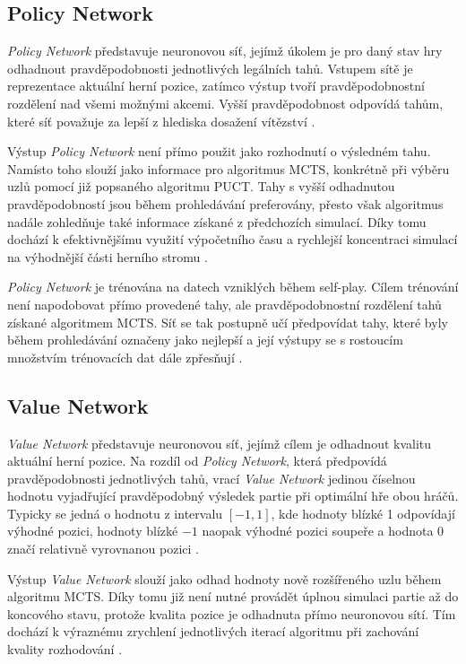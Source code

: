 \subsection{Policy Network}

\emph{Policy Network} představuje neuronovou síť, jejímž úkolem je pro daný stav hry odhadnout pravděpodobnosti jednotlivých 
legálních tahů. Vstupem sítě je reprezentace aktuální herní pozice, zatímco výstup tvoří pravděpodobnostní rozdělení nad všemi 
možnými akcemi. Vyšší pravděpodobnost odpovídá tahům, které síť považuje za lepší z hlediska dosažení vítězství \cite{silver2017alphazero}.

Výstup \emph{Policy Network} není přímo použit jako rozhodnutí o výsledném tahu. Namísto toho slouží jako informace pro algoritmus MCTS, 
konkrétně při výběru uzlů pomocí již popsaného algoritmu PUCT. Tahy s vyšší odhadnutou pravděpodobností jsou během prohledávání preferovány, přesto však 
algoritmus nadále zohledňuje také informace získané z předchozích simulací. Díky tomu dochází k efektivnějšímu využití výpočetního času a 
rychlejší koncentraci simulací na výhodnější části herního stromu \cite{silver2017alphazero}.

\emph{Policy Network} je trénována na datech vzniklých během self-play. Cílem trénování není napodobovat přímo provedené tahy, ale pravděpodobnostní 
rozdělení tahů získané algoritmem MCTS. Síť se tak postupně učí předpovídat tahy, které byly během prohledávání označeny jako nejlepší 
a její výstupy se s rostoucím množstvím trénovacích dat dále zpřesňují \cite{silver2017alphazero}.

\subsection{Value Network}

\emph{Value Network} představuje neuronovou síť, jejímž cílem je odhadnout kvalitu aktuální herní pozice. Na rozdíl od \emph{Policy Network}, 
která předpovídá pravděpodobnosti jednotlivých tahů, vrací \emph{Value Network} jedinou číselnou hodnotu vyjadřující pravděpodobný výsledek 
partie při optimální hře obou hráčů. Typicky se jedná o hodnotu z intervalu $[-1,1]$, kde hodnoty blízké 1 odpovídají výhodné pozici, 
hodnoty blízké $-1$ naopak výhodné pozici soupeře a hodnota 0 značí relativně vyrovnanou pozici \cite{silver2017alphazero}.

Výstup \emph{Value Network} slouží jako odhad hodnoty nově rozšířeného uzlu během algoritmu MCTS. Díky tomu již není nutné provádět úplnou simulaci 
partie až do koncového stavu, protože kvalita pozice je odhadnuta přímo neuronovou sítí. Tím dochází k výraznému zrychlení jednotlivých iterací 
algoritmu při zachování kvality rozhodování \cite{silver2017alphazero}.

